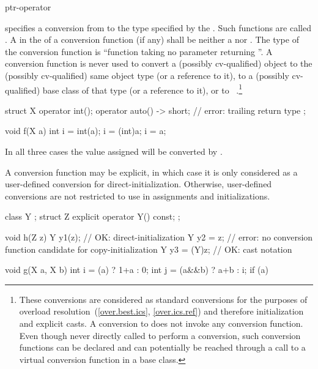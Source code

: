 \begin{bnf}
\br
    ptr-operator 
\end{bnf}
specifies a conversion from
to the type specified by the
.
Such functions are called .
A  in the 
of a conversion function (if any) shall be neither
a  nor .
%
The type of the conversion function is
``function taking no parameter returning
''.
A conversion function is never used to convert a (possibly cv-qualified) object
to the (possibly cv-qualified) same object type (or a reference to it),
to a (possibly cv-qualified) base class of that type (or a reference to it),
or to \cv{}~.\footnote{These conversions are considered
as standard conversions for the purposes of overload resolution~(\ref{over.best.ics}, \ref{over.ics.ref}) and therefore initialization and explicit casts. A conversion to  does not invoke any conversion function.
Even though never directly called to perform a conversion,
such conversion functions can be declared and can potentially
be reached through a call to a virtual conversion function in a base class.}
\begin{example}
\begin{codeblock}
struct X {
  operator int();
  operator auto() -> short;     // error: trailing return type
};

void f(X a) {
  int i = int(a);
  i = (int)a;
  i = a;
}
\end{codeblock}
In all three cases the value assigned will be converted by
.
\end{example}

\pnum
A conversion function may be explicit, in which case it is only considered as a user-defined conversion for direct-initialization. Otherwise, user-defined conversions are not restricted to use in assignments and initializations.
\begin{example}
\begin{codeblock}
class Y { };
struct Z {
  explicit operator Y() const;
};

void h(Z z) {
  Y y1(z);          // OK: direct-initialization
  Y y2 = z;         // error: no conversion function candidate for copy-initialization
  Y y3 = (Y)z;      // OK: cast notation
}

void g(X a, X b) {
  int i = (a) ? 1+a : 0;
  int j = (a&&b) ? a+b : i;
  if (a) {
  }
}
\end{codeblock}
\end{example}

